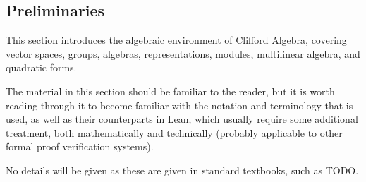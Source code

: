 \subsection{Preliminaries}

This section introduces the algebraic environment of Clifford Algebra,
covering vector spaces, groups, algebras, representations, modules, multilinear algebra, 
and quadratic forms.

The material in this section should be familiar to the reader, but it is worth reading
 through it to become familiar with the notation and terminology that is used,
 as well as their counterparts in Lean, which usually require some additional treatment, both
 mathematically and technically (probably applicable to other formal proof verification systems).

No details will be given as these are given in standard textbooks, such as TODO.